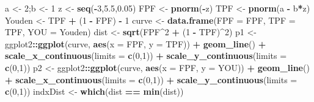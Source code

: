 \documentclass[
]{book}
\newenvironment{Shaded}{\begin{snugshade}}{\end{snugshade}}
\newcommand{\DataTypeTok}[1]{\textcolor[rgb]{0.13,0.29,0.53}{#1}}
\newcommand{\DecValTok}[1]{\textcolor[rgb]{0.00,0.00,0.81}{#1}}
\newcommand{\FloatTok}[1]{\textcolor[rgb]{0.00,0.00,0.81}{#1}}
\newcommand{\KeywordTok}[1]{\textcolor[rgb]{0.13,0.29,0.53}{\textbf{#1}}}
\newcommand{\NormalTok}[1]{#1}
\newcommand{\OperatorTok}[1]{\textcolor[rgb]{0.81,0.36,0.00}{\textbf{#1}}}
\newcommand{\StringTok}[1]{\textcolor[rgb]{0.31,0.60,0.02}{#1}}
\begin{document}
\begin{Shaded}
\begin{Highlighting}[]
\NormalTok{a <-}\StringTok{ }\DecValTok{2}\NormalTok{;b <-}\StringTok{ }\DecValTok{1}
\NormalTok{z <-}\StringTok{ }\KeywordTok{seq}\NormalTok{(}\OperatorTok{-}\DecValTok{3}\NormalTok{,}\FloatTok{5.5}\NormalTok{,}\FloatTok{0.05}\NormalTok{)}
\NormalTok{FPF <-}\StringTok{ }\KeywordTok{pnorm}\NormalTok{(}\OperatorTok{-}\NormalTok{z)}
\NormalTok{TPF <-}\StringTok{ }\KeywordTok{pnorm}\NormalTok{(a }\OperatorTok{-}\StringTok{ }\NormalTok{b}\OperatorTok{*}\NormalTok{z)}
\NormalTok{Youden <-}\StringTok{ }\NormalTok{TPF }\OperatorTok{+}\StringTok{ }\NormalTok{(}\DecValTok{1} \OperatorTok{-}\StringTok{ }\NormalTok{FPF) }\OperatorTok{-}\StringTok{ }\DecValTok{1}
\NormalTok{curve <-}\StringTok{ }\KeywordTok{data.frame}\NormalTok{(}\DataTypeTok{FPF =}\NormalTok{ FPF, }\DataTypeTok{TPF =}\NormalTok{ TPF, }\DataTypeTok{YOU =}\NormalTok{ Youden)}
\NormalTok{dist <-}\StringTok{ }\KeywordTok{sqrt}\NormalTok{(FPF}\OperatorTok{^}\DecValTok{2} \OperatorTok{+}\StringTok{ }\NormalTok{(}\DecValTok{1} \OperatorTok{-}\StringTok{ }\NormalTok{TPF)}\OperatorTok{^}\DecValTok{2}\NormalTok{)}
\NormalTok{p1 <-}\StringTok{ }\NormalTok{ggplot2}\OperatorTok{::}\KeywordTok{ggplot}\NormalTok{(curve, }\KeywordTok{aes}\NormalTok{(}\DataTypeTok{x =}\NormalTok{ FPF, }\DataTypeTok{y =}\NormalTok{ TPF)) }\OperatorTok{+}\StringTok{ }
\StringTok{  }\KeywordTok{geom_line}\NormalTok{() }\OperatorTok{+}
\StringTok{  }\KeywordTok{scale_x_continuous}\NormalTok{(}\DataTypeTok{limits =} \KeywordTok{c}\NormalTok{(}\DecValTok{0}\NormalTok{,}\DecValTok{1}\NormalTok{)) }\OperatorTok{+}\StringTok{ }\KeywordTok{scale_y_continuous}\NormalTok{(}\DataTypeTok{limits =} \KeywordTok{c}\NormalTok{(}\DecValTok{0}\NormalTok{,}\DecValTok{1}\NormalTok{))}
\NormalTok{p2 <-}\StringTok{ }\NormalTok{ggplot2}\OperatorTok{::}\KeywordTok{ggplot}\NormalTok{(curve, }\KeywordTok{aes}\NormalTok{(}\DataTypeTok{x =}\NormalTok{ FPF, }\DataTypeTok{y =}\NormalTok{ YOU)) }\OperatorTok{+}\StringTok{ }
\StringTok{  }\KeywordTok{geom_line}\NormalTok{() }\OperatorTok{+}
\StringTok{  }\KeywordTok{scale_x_continuous}\NormalTok{(}\DataTypeTok{limits =} \KeywordTok{c}\NormalTok{(}\DecValTok{0}\NormalTok{,}\DecValTok{1}\NormalTok{)) }\OperatorTok{+}\StringTok{ }\KeywordTok{scale_y_continuous}\NormalTok{(}\DataTypeTok{limits =} \KeywordTok{c}\NormalTok{(}\DecValTok{0}\NormalTok{,}\DecValTok{1}\NormalTok{))}
\NormalTok{indxDist <-}\StringTok{ }\KeywordTok{which}\NormalTok{(dist }\OperatorTok{==}\StringTok{ }\KeywordTok{min}\NormalTok{(dist))}

\end{Highlighting}
\end{Shaded}
\end{document}
